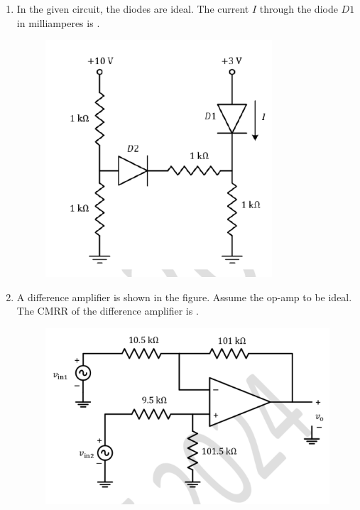 \documentclass[journal,12pt,onecolumn]{IEEEtran}
\theoremstyle{remark}
\begin{document}
\begin{enumerate}[start=1, label=Q.\arabic*]
    \hfill{}

    \item In the given circuit, the diodes are ideal. The current $I$ through the diode $D1$ in milliamperes is \underline{\hspace{2cm}} .
    \begin{figure}[H]
        \includegraphics[width=0.6\columnwidth]{Figures/q60.png}
        \centering
        \caption{}
    \end{figure}

    \hfill{}
    \item A difference amplifier is shown in the figure. Assume the op-amp to be ideal. The CMRR  of the difference amplifier is \underline{\hspace{2cm}} .
    \begin{figure}[H]
        \includegraphics[width=0.8\columnwidth]{Figures/q61.png}
        \centering
        \caption{}
    \end{figure}


\end{enumerate}
\end{document}
